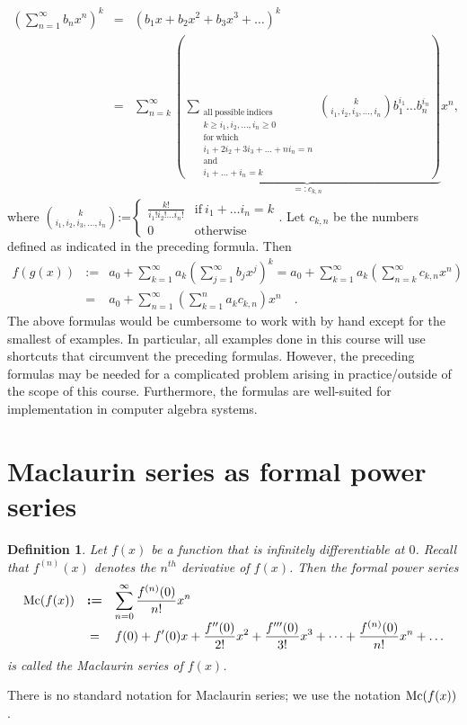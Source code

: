 \documentclass[12pt]{book}
\newcommand{\eqdef}{\textbf{:=}}
\newtheorem{definition}[theorem]{Definition}
\newcommand{\doublebrace}[4]{\left\{\begin{array}{ll} #1 & #2 \\#3 & #4  \end{array} \right.}
\begin{document}
\[
\begin{array}{rcl}
\displaystyle
\left(\sum_{n=1}^{\infty} b_n x^n\right)^k &=&   (b_1 x+ b_2x^2+b_3x^3+\dots)^k\\
&=&\displaystyle \sum_{n=k}^{\infty}\underbrace{\left( \sum_{\substack{\mathrm{all~possible~indices}\\ k\geq i_1, i_2,\dots, i_n\geq 0\\
\mathrm{for~which}\\i_1+2i_2+3i_3+\dots + ni_n =n  \\ \mathrm{and} \\ i_1+\dots +i_n=k}}\binom{k}{i_1, i_2, i_3, \dots, i_n}  b_{1}^{i_1}\dots b_{n}^{i_n} \right)}_{=: c_{k,n}} x^n,
\end{array}
\]
where $\binom{k}{i_1, i_2, i_3, \dots, i_n}\eqdef  \doublebrace{\frac{k!}{i_1!i_2!\dots i_n!}}{\mathrm{if~}i_1+\dots i_n=k}{0}{\mathrm{otherwise}}$. Let $c_{k,n}$ be the numbers defined as indicated in the preceding formula. Then
\[
\begin{array}{rcl}
f(g(x)) &\eqdef&\displaystyle a_0+ \sum_{k=1}^\infty a_k\left(\sum_{j=1}^{\infty} b_j x^j\right)^k = a_0+\sum_{k=1}^\infty a_k \left(\sum_{n=k}^{\infty} c_{k,n}x^n \right)\\
&=&\displaystyle a_0+\sum_{n=1}^{\infty} \left(\sum_{k=1}^n a_k c_{k,n} \right)x^n\quad .
\end{array}
\]
The above formulas would be cumbersome to work with by hand except for the smallest of examples. In particular, all examples done in this course will use shortcuts that circumvent the preceding formulas. However, the preceding formulas may be needed for a complicated problem arising in practice/outside of the scope of this course. Furthermore, the formulas are well-suited for implementation in computer algebra systems.

\section{Maclaurin series as formal power series}\label{secMaclaurinSeries}
\begin{definition}\label{defMaclaurinSeries}
 Let $f(x)$ be a function that is infinitely differentiable at $0$. Recall that $f^{(n)}(x)$ denotes the $n^{th}$ derivative of $f(x)$. Then the formal power series
\begin{equation}\label{eqMacLaurinDef}
\begin{array}{rcl}
\maclaurin (f(x))&\eqdef&\displaystyle \sum_{n=0}^{\infty}  \frac{f^{(n)} (0)}{n!} x^n\\
&=& \displaystyle f(0)+f'(0)x+ \frac{f''(0)}{2!}x^2 + \frac{f'''(0)}{3!} x^3 + \dots + \frac{f^{(n)}(0)}{n!}x^n+\dots
\end{array}
\end{equation}
is called the Maclaurin series of $f(x)$.
\end{definition}
There is no standard notation for Maclaurin series; we use the notation $\operatorname{{\normalfont{Mc}}} (f(x))$.
\end{document}
